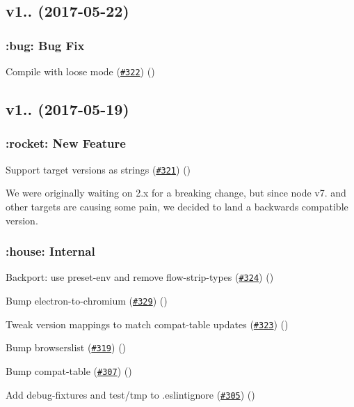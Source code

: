 \subsection*{v1.. (2017-\/05-\/22)}

\subsubsection*{\+:bug\+: Bug Fix}


\begin{DoxyItemize}
\item Compile with loose mode (\href{https://github.com/babel/babel-preset-env/pull/332}{\tt \#322}) ()
\end{DoxyItemize}

\subsection*{v1.. (2017-\/05-\/19)}

\subsubsection*{\+:rocket\+: New Feature}


\begin{DoxyItemize}
\item Support target versions as strings (\href{https://github.com/babel/babel-preset-env/pull/321}{\tt \#321}) ()
\end{DoxyItemize}

We were originally waiting on 2.\+x for a breaking change, but since node v7. and other targets are causing some pain, we decided to land a backwards compatible version.

\subsubsection*{\+:house\+: Internal}


\begin{DoxyItemize}
\item Backport\+: use preset-\/env and remove flow-\/strip-\/types (\href{https://github.com/babel/babel-preset-env/pull/324}{\tt \#324}) ()
\item Bump electron-\/to-\/chromium (\href{https://github.com/babel/babel-preset-env/pull/329}{\tt \#329}) ()
\item Tweak version mappings to match compat-\/table updates (\href{https://github.com/babel/babel-preset-env/pull/323}{\tt \#323}) ()
\item Bump browserslist (\href{https://github.com/babel/babel-preset-env/pull/319}{\tt \#319}) ()
\item Bump compat-\/table (\href{https://github.com/babel/babel-preset-env/pull/307}{\tt \#307}) ()
\item Add debug-\/fixtures and test/tmp to .eslintignore (\href{https://github.com/babel/babel-preset-env/pull/305}{\tt \#305}) ()
\end{DoxyItemize}

